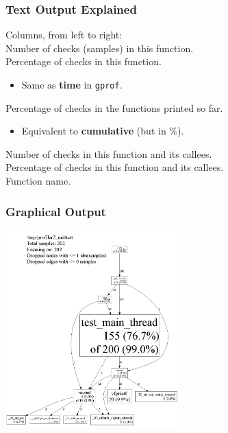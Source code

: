 \begin{frame}
  \frametitle{Text Output Explained}

\large
\begin{changemargin}{1.5cm}
  
    Columns, from left to right:\\[1em]

    Number of checks (samples) in this function.\\
    Percentage of checks in this function.
      \begin{itemize}
        \item Same as {\bf time} in {\tt gprof}.\\[1em]
      \end{itemize}
    Percentage of checks in the functions printed so far.
      \begin{itemize}
        \item Equivalent to {\bf cumulative} (but in \%).\\[1em]
      \end{itemize}
    Number of checks in this function and its callees.\\
    Percentage of checks in this function and its callees.\\
    Function name.
    \end{changemargin}
\end{frame}

\begin{frame}
  \frametitle{Graphical Output}

  \begin{center}
    \includegraphics[width=0.5\textwidth]{images/pprof-test-big.png}
  \end{center}
\end{frame}

